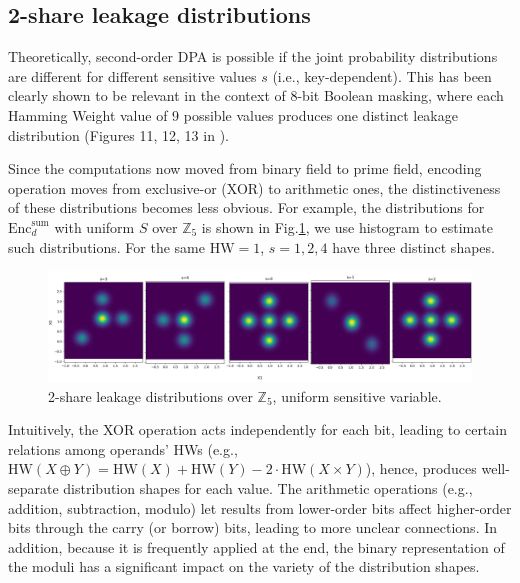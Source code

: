 \documentclass{llncs}
\begin{document}
	
	\subsection{2-share leakage distributions}
	
	Theoretically, second-order DPA is possible if the joint probability distributions are different for different sensitive values $s$ (i.e., key-dependent). This has been clearly shown to be relevant in the context of 8-bit Boolean masking, where each Hamming Weight value of 9 possible values produces one distinct leakage distribution (Figures 11, 12, 13 in \cite{2dpa}).
	
	Since the computations now moved from binary field to prime field, encoding operation moves from exclusive-or (XOR) to arithmetic ones, the distinctiveness of these distributions becomes 
	less obvious. For example, the distributions for $\text{Enc}^{\text{sum}}_{d}$ with uniform $S$ over $\mathbb{Z}_5$ is shown in Fig.\ref{fig:dist5_sum}, we use histogram to estimate such distributions. For the same $\text{HW}=1$, $s=1, 2, 4$ have three distinct shapes. 
	\begin{figure}
		\vspace*{-0.0cm}
		\hspace*{0.0cm}\centering \includegraphics[width=12.0cm]{figures/5_dist_sum.png}
		\vspace*{0.3cm}
		\caption{2-share leakage distributions over $\mathbb{Z}_5$, uniform sensitive variable.}\label{fig:dist5_sum}\vspace*{-0.0cm}
	\end{figure}
	
	Intuitively, the XOR operation acts independently for each bit, leading to certain  relations among operands' HWs (e.g., $\text{HW}(X\oplus Y) = \text{HW}(X) + \text{HW}(Y) - 2\cdot\text{HW}(X\times Y)$), hence, produces well-separate distribution shapes for each value. The arithmetic operations (e.g., addition, subtraction, modulo) let results from lower-order bits affect higher-order bits through the carry (or borrow) bits, leading to more unclear connections. In addition, because it is frequently applied at the end, the binary representation of the moduli has a significant impact on the variety of the distribution shapes.
	
\end{document}
